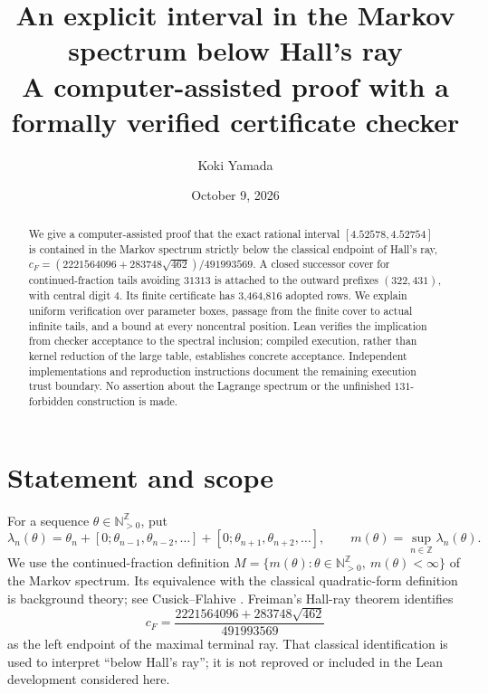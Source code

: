 \documentclass[11pt,a4paper]{article}
\title{An explicit interval in the Markov spectrum below Hall's ray\\
\large A computer-assisted proof with a formally verified certificate checker}
\author{Koki Yamada}
\date{October 9, 2026}
\newcommand{\N}{\mathbb N}
\newcommand{\dd}{\sqrt{462}}
\begin{document}
\maketitle
\begin{abstract}
We give a computer-assisted proof that the exact rational interval
$[4.52578,4.52754]$ is contained in the Markov spectrum strictly below the classical endpoint of
Hall's ray,
$c_F=(2221564096+283748\sqrt{462})/491993569$. A closed successor cover for continued-fraction tails avoiding
$31313$ is attached to the outward prefixes $(322,431)$, with central
digit $4$. Its finite certificate has 3,464,816 adopted rows. We explain
uniform verification over parameter boxes, passage from the finite cover
to actual infinite tails, and a bound at every noncentral position.
Lean verifies the implication from checker acceptance to the spectral
inclusion; compiled execution, rather than kernel reduction of the large
table, establishes concrete acceptance. Independent implementations and
reproduction instructions document the remaining execution trust boundary.
No assertion about the Lagrange spectrum or the unfinished $131$-forbidden
construction is made.
\end{abstract}

\section{Statement and scope}
For a sequence $\theta\in\N_{>0}^{\mathbb Z}$, put
\[
 \lambda_n(\theta)=\theta_n+[0;\theta_{n-1},\theta_{n-2},\ldots]
                         +[0;\theta_{n+1},\theta_{n+2},\ldots],\qquad
 m(\theta)=\sup_{n\in\mathbb Z}\lambda_n(\theta).
\]
We use the continued-fraction definition
$M=\{m(\theta):\theta\in\N_{>0}^{\mathbb Z},\ m(\theta)<\infty\}$
of the Markov spectrum. Its equivalence with the classical quadratic-form
definition is background theory; see Cusick--Flahive \cite{CF}.
Freiman's Hall-ray theorem \cite{Freiman} identifies
\[
 c_F=\frac{2221564096+283748\dd}{491993569}
\]
as the left endpoint of the maximal terminal ray. That classical
identification is used to interpret ``below Hall's ray''; it is not
reproved or included in the Lean development considered here.
\end{document}
